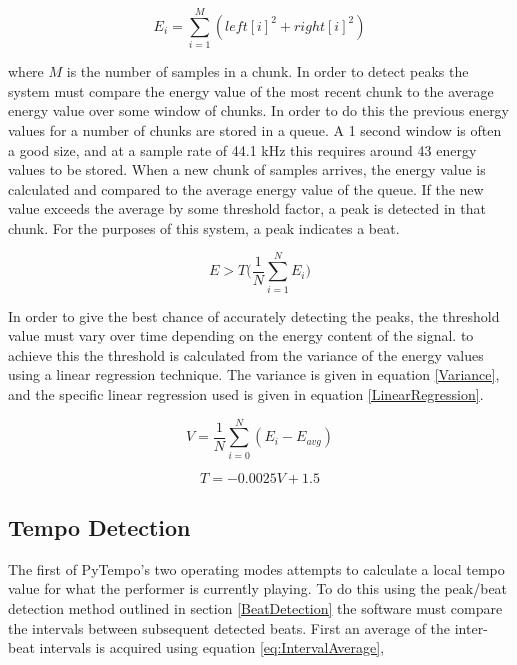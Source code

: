 \documentclass[hidelinks,12pt]{article}
\begin{document}
\begin{equation} \label{eq:EnergySum}
	E_i = \sum_{i=1}^{M}(left[i]^2 + right[i]^2)
\end{equation}

where $M$ is the number of samples in a chunk. In order to detect peaks the system must compare the energy value of the most recent chunk to the average energy value over some window of chunks. In order to do this the previous energy values for a number of chunks are stored in a queue. A 1 second window is often a good size, and at a sample rate of 44.1 kHz this requires around 43 energy values to be stored. When a new chunk of samples arrives, the energy value is calculated and compared to the average energy value of the queue. If the new value exceeds the average by some threshold factor, a peak is detected in that chunk. For the purposes of this system, a peak indicates a beat.

\begin{equation}
	E > T\Bigg(\frac{1}{N}\sum_{i=1}^{N}E_i\Bigg)
\end{equation}

In order to give the best chance of accurately detecting the peaks, the threshold value must vary over time depending on the energy content of the signal. to achieve this the threshold is calculated from the variance of the energy values using a linear regression technique\cite{BeatDetection}. The variance is given in equation \ref{Variance}, and the specific linear regression used is given in equation \ref{LinearRegression}.

\begin{equation} \label{Variance}
	V = \frac{1}{N}\sum_{i=0}^{N}(E_i - E_{avg})
\end{equation}

\begin{equation} \label{LinearRegression}
	T = -0.0025V + 1.5
\end{equation}


\subsection{Tempo Detection}
The first of PyTempo's two operating modes attempts to calculate a local tempo value for what the performer is currently playing. To do this using the peak/beat detection method outlined in section  \ref{BeatDetection} the software must compare the intervals between subsequent detected beats. First an average of the inter-beat intervals is acquired using equation \ref{eq:IntervalAverage},
\end{document}
